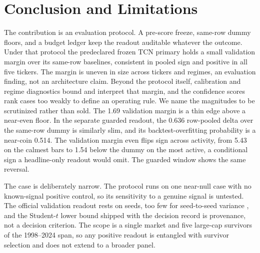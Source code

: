 \section{Conclusion and Limitations}
\label{sec:limitations}

The contribution is an evaluation protocol. A pre-score
freeze, same-row dummy floors, and a budget ledger keep the readout auditable
whatever the outcome. Under that protocol the predeclared frozen TCN primary
holds a small validation margin over its same-row baselines, consistent in pooled
sign and positive in all five tickers. The margin is uneven in size across tickers and
regimes, an evaluation finding, not an architecture claim. Beyond the protocol itself, calibration and regime diagnostics bound and interpret
that margin, and the confidence scores rank cases too weakly to define an
operating rule. We name the magnitudes to be scrutinized rather than sold. The 1.69\pp{}
validation margin is a thin edge above a near-even floor. In the separate
guarded readout, the 0.636\pp{} row-pooled delta over the same-row dummy is
similarly slim, and its backtest-overfitting probability is a near-coin 0.514. The validation margin even flips sign across
activity, from 5.43\pp{} on the calmest bars to 1.54\pp{} below the dummy on the
most active, a conditional sign a headline-only readout would omit. The guarded window shows the same reversal.

The case is deliberately narrow. The protocol runs on one near-null case with no
known-signal positive control, so its sensitivity to a genuine signal is untested.
The official validation readout rests on \numseeds{} seeds, too few for
seed-to-seed variance \cite{bouthillier2021accounting,picard2021torch}, and the
Student-$t$ lower bound shipped with the decision record is provenance, not a
decision criterion. The scope is a single market and five large-cap survivors of
the 1998--2024 span, so any positive readout is entangled with survivor selection
and does not extend to a broader panel.

